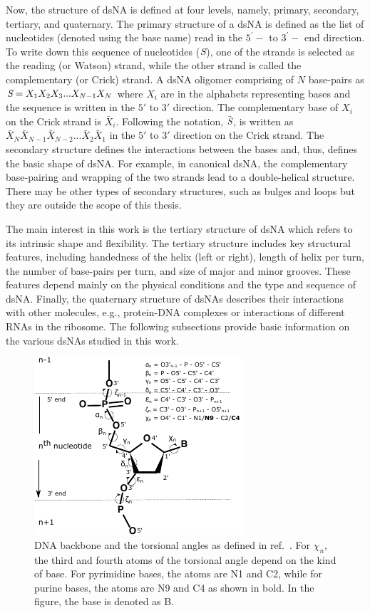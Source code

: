 Now, the structure of dsNA is defined at four levels, namely, primary, secondary, tertiary, and quaternary.
The primary structure of a dsNA is defined as the list of nucleotides (denoted using the base name) read in the $5^\prime-$ to $3^\prime-$ end direction.
To write down this sequence of nucleotides (${\textit{S}}$), one of the strands is selected as the reading (or Watson) strand, while the other strand is called the complementary (or Crick) strand.
A dsNA oligomer comprising  of $N$ base-pairs as ${\textit{S}} = X_1X_2X_3...X_{N-1}X_N$ where $X_i$ are in the alphabets representing bases and the sequence is written in the $5'$ to $3'$ direction.
The complementary base of $X_i$ on the Crick strand is $\bar{X}_{i}$.
Following the notation, $\bar{{\textit{S}}}$, is written as $\bar{X}_N\bar{X}_{N-1}\bar{X}_{N-2}...\bar{X}_2\bar{X}_1$ in the $5'$ to $3'$ direction on the Crick strand. 
The secondary structure defines the interactions between the bases and, thus, defines the basic shape of dsNA. 
For example, in canonical dsNA, the complementary base-pairing and wrapping of the two strands lead to a double-helical structure.
There may be other types of secondary structures, such as bulges and loops but they are outside the scope of this thesis. 

The main interest in this work is the tertiary structure of dsNA which refers to its intrinsic shape and flexibility.
The tertiary structure includes key structural features, including handedness of the helix (left or right), length of helix per turn, the number of base-pairs per turn, and size of major and minor grooves.
These features depend mainly on the physical conditions and the type and sequence of dsNA. 
Finally, the quaternary structure of dsNAs describes their interactions with other molecules, e.g., protein-DNA complexes or interactions of different RNAs in the ribosome.
The following subsections provide basic information on the various dsNAs studied in this work.

\begin{figure}[htb]
	\begin{center}
	\centering\includegraphics[scale=1.7]{images/backbone.pdf}
	\centering\caption{DNA backbone and the torsional angles as defined in ref.~\cite{schneider1997conformations}. 
	For $\chi_n$, the third and fourth atoms of the torsional angle depend on the kind of base. For pyrimidine bases, the atoms are N1 and C2, while for purine bases, the atoms are N9 and C4 as shown in bold.
	In the figure, the base is denoted as B.
	}
\label{c1:fig3}
\end{center}
\end{figure}
